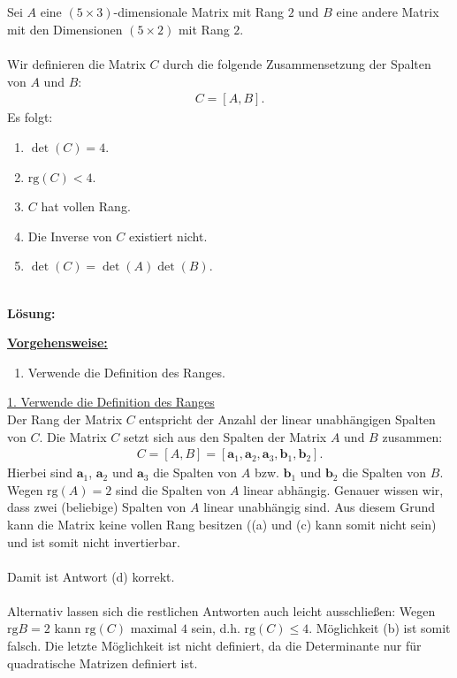 \newpage
\subsection*{}
Sei $ A $ eine $ (5 \times 3) $-dimensionale Matrix mit Rang $ 2 $ und $ B $ eine andere Matrix mit den Dimensionen $ (5 \times 2) $ mit Rang $ 2 $.\\
\\
Wir definieren die Matrix $ C $ durch die folgende Zusammensetzung der Spalten von $ A $ und $ B $:
\begin{align*}
	C = [A, B].
\end{align*}
Es folgt:
\renewcommand{\labelenumi}{(\alph{enumi})}
\begin{enumerate}
	\item 
	$ \det(C) = 4$.
	\item
	$ \mathrm{rg}(C) < 4 $.
	\item
	$ C$ hat vollen Rang.
	\item
	Die Inverse von $C$ existiert nicht.
	\item
	$\det(C) = \det(A) \det(B)$.
\end{enumerate}
\ \\
\textbf{Lösung:}
\begin{mdframed}
	\underline{\textbf{Vorgehensweise:}}
	\renewcommand{\labelenumi}{\theenumi.}
	\begin{enumerate}
		\item Verwende die Definition des Ranges.
	\end{enumerate}
\end{mdframed}

\underline{1. Verwende die Definition des Ranges}\\
Der Rang der Matrix $C$ entspricht der Anzahl der linear unabhängigen Spalten von $C$.
Die Matrix $C$ setzt sich aus den Spalten der Matrix $A$ und $B$ zusammen:
\begin{align*}
	C = [A, B] = [ \mathbf{a}_1, \mathbf{a}_2, \mathbf{a}_3,  \mathbf{b}_1, \mathbf{b}_2 ].
\end{align*}
Hierbei sind $\mathbf{a}_1$, $\mathbf{a}_2$ und $\mathbf{a}_3$ die Spalten von $A$ bzw. $\mathbf{b}_1$ und $\mathbf{b}_2$ die Spalten von $ B$.\\
Wegen $\mathrm{rg}(A) = 2$ sind die Spalten von $A$ linear abhängig. Genauer wissen wir, dass zwei (beliebige) Spalten von $A$ linear unabhängig sind. Aus diesem Grund kann die Matrix keine vollen Rang besitzen ((a) und (c) kann somit nicht sein) und ist somit nicht invertierbar.\\
\\
Damit ist Antwort (d) korrekt.\\
\\
Alternativ lassen sich die restlichen Antworten auch leicht ausschließen:
Wegen $\mathrm{rg}{B} = 2$ kann $\mathrm{rg}(C) $ maximal $4$ sein, d.h. $\mathrm{rg}(C) \leq 4$. Möglichkeit (b) ist somit falsch.
Die letzte Möglichkeit ist nicht definiert, da die Determinante nur für quadratische Matrizen definiert ist.



